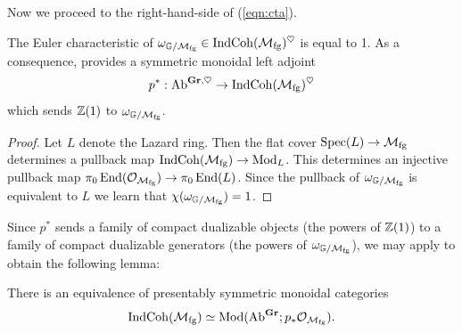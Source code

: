 Now we proceed to the right-hand-side of (\ref{eqn:cta}).

\begin{lem} \label{lem:omega-euler-one}
  The Euler characteristic of $\omega_{\mathbb{G}/\mathcal{M}_{\mathrm{fg}}} \in \mathrm{IndCoh}(\mathcal{M}_{\mathrm{fg}})^{\heartsuit}$ is equal to 1.
  As a consequence,  provides a symmetric monoidal left adjoint
  \[ p^* : \mathrm{Ab}^{\operatorname{\mathbf{Gr}}, \heartsuit} \to \mathrm{IndCoh}(\mathcal{M}_{\mathrm{fg}})^{\heartsuit} \]
  which sends $\mathbb{Z}(1)$ to $\omega_{\mathbb{G}/\mathcal{M}_{\mathrm{fg}}}$.
\end{lem}

\begin{proof}
  Let $L$ denote the Lazard ring. Then the flat cover $\operatorname{\mathrm{Spec}}(L) \to \mathcal{M}_{\mathrm{fg}}$ determines a pullback map $\mathrm{IndCoh}(\mathcal{M}_{\mathrm{fg}}) \to \mathrm{Mod}_{L}$. This determines an injective pullback map
  $\pi_0 \operatorname{\mathrm{End}}(\mathcal{O}_{\mathcal{M}_{\mathrm{fg}}}) \to \pi_0 \operatorname{\mathrm{End}}(L)$.
  Since the pullback of $\omega_{\mathbb{G}/\mathcal{M}_{\mathrm{fg}}}$ is equivalent to $L$ we learn that $\chi(\omega_{\mathbb{G}/\mathcal{M}_{\mathrm{fg}}}) = 1$.
\end{proof}

Since $p^*$ sends a family of compact dualizable objects (the powers of $\mathbb{Z}(1)$) to a family of compact dualizable generators (the powers of $\omega_{\mathbb{G}/\mathcal{M}_{\mathrm{fg}}}$), we may apply  to obtain the following lemma:

\begin{lem}\label{lem:MU-koszul}
  There is an equivalence of presentably symmetric monoidal categories
  \[ \mathrm{IndCoh}(\mathcal{M}_{\mathrm{fg}}) \simeq \mathrm{Mod}(\mathrm{Ab}^{\operatorname{\mathbf{Gr}}}; p_*\mathcal{O}_{\mathcal{M}_{\mathrm{fg}}} ). \]
\end{lem}

  
